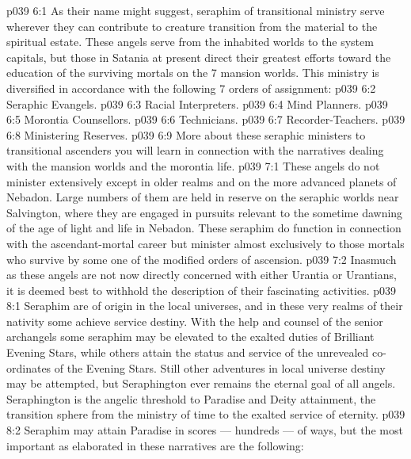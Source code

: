 \vs p039 6:1 As their name might suggest, seraphim of transitional ministry serve wherever they can contribute to creature transition from the material to the spiritual estate. These angels serve from the inhabited worlds to the system capitals, but those in Satania at present direct their greatest efforts toward the education of the surviving mortals on the 7 mansion worlds. This ministry is diversified in accordance with the following 7 orders of assignment:
\vs p039 6:2 \bibnobreakspace Seraphic Evangels.
\vs p039 6:3 \bibnobreakspace Racial Interpreters.
\vs p039 6:4 \bibnobreakspace Mind Planners.
\vs p039 6:5 \bibnobreakspace Morontia Counsellors.
\vs p039 6:6 \bibnobreakspace Technicians.
\vs p039 6:7 \bibnobreakspace Recorder\hyp{}Teachers.
\vs p039 6:8 \bibnobreakspace Ministering Reserves.
\vs p039 6:9 \pc More about these seraphic ministers to transitional ascenders you will learn in connection with the narratives dealing with the mansion worlds and the morontia life.
\vs p039 7:1 These angels do not minister extensively except in older realms and on the more advanced planets of Nebadon. Large numbers of them are held in reserve on the seraphic worlds near Salvington, where they are engaged in pursuits relevant to the sometime dawning of the age of light and life in Nebadon. These seraphim do function in connection with the ascendant\hyp{}mortal career but minister almost exclusively to those mortals who survive by some one of the modified orders of ascension.
\vs p039 7:2 Inasmuch as these angels are not now directly concerned with either Urantia or Urantians, it is deemed best to withhold the description of their fascinating activities.
\vs p039 8:1 Seraphim are of origin in the local universes, and in these very realms of their nativity some achieve service destiny. With the help and counsel of the senior archangels some seraphim may be elevated to the exalted duties of Brilliant Evening Stars, while others attain the status and service of the unrevealed co\hyp{}ordinates of the Evening Stars. Still other adventures in local universe destiny may be attempted, but Seraphington ever remains the eternal goal of all angels. Seraphington is the angelic threshold to Paradise and Deity attainment, the transition sphere from the ministry of time to the exalted service of eternity.
\vs p039 8:2 \pc Seraphim may attain Paradise in scores --- hundreds --- of ways, but the most important as elaborated in these narratives are the following:

